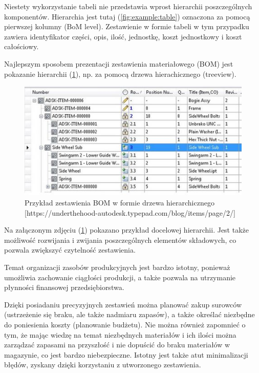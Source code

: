 \documentclass[12pt,twoside]{article}
\begin{document}
Niestety wykorzystanie tabeli nie przedstawia wprost hierarchii poszczególnych komponentów. Hierarchia jest tutaj (\ref{fig:example:table}) oznaczona za pomocą pierwszej kolumny (BoM level). Zestawienie w formie tabeli w tym przypadku zawiera identyfikator części, opis, ilość, jednostkę, koszt jednostkowy i koszt całościowy.

Najlepszym sposobem prezentacji zestawienia materiałowego (BOM) jest pokazanie hierarchii (\ref{fig:example:hierarchy}), np. za pomocą drzewa hierachicznego (treeview).

\begin{figure}[h]
	\centering
	\includegraphics[width=\textwidth]{figures/examples/hierarchy.jpg}
	\caption{Przykład zestawienia BOM w formie drzewa hierarchicznego [https://underthehood-autodesk.typepad.com/blog/items/page/2/]}
\label{fig:example:hierarchy}
\end{figure}

Na załączonym zdjęciu (\ref{fig:example:hierarchy}) pokazano przykład docelowej hierarchii. Jest także możliwość rozwijania i zwijania poszczególnych elementów składowych, co pozwala zwiększyć czytelność zestawienia.

Temat organizacji zasobów produkcyjnych jest bardzo istotny, ponieważ umożliwia zachowanie ciągłości produkcji, a także pozwala na utrzymanie płynności finansowej przedsiębiorstwa.

Dzięki posiadaniu precyzyjnych zestawień można planować zakup surowców (ustrzeżenie się braku, ale także nadmiaru zapasów), a także określać niezbędne do poniesienia koszty (planowanie budżetu). Nie można również zapomnieć o tym, że mając wiedzę na temat niezbędnych materiałów i ich ilości można zarządzać zapasami na przyszłość i nie dopuścić do braku materiałów w magazynie, co jest bardzo niebezpieczne. Istotny jest także atut minimalizacji błędów, zyskany dzięki korzystaniu z utworzonego zestawienia.
\end{document}
